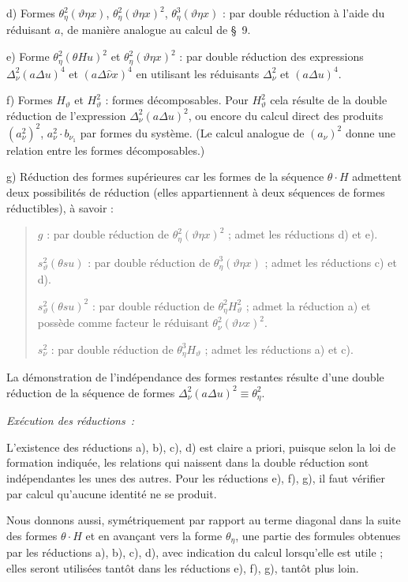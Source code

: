 \documentclass[11pt]{article}
\newcommand{\A}{\Delta}
\begin{document}
d) Formes $\theta_\eta^2(\vartheta\eta x)$, $\theta_\eta^2(\vartheta\eta x)^2$, $\theta_\eta^3(\vartheta\eta x)$ : par double réduction à l'aide du réduisant $a$, de manière analogue au calcul de \S\ 9.

e) Forme $\theta_\eta^2(\theta Hu)^2$ et $\theta_\eta^2(\vartheta\eta x)^2$ : par double réduction des expressions $\A_\nu^2(a\A u)^4$ et $(a\A\widehat{\nu}x)^4$ en utilisant les réduisants $\A_\nu^2$ et $(a\A u)^4$.

f) Formes $H_\vartheta$ et $H_\vartheta^2$ : formes décomposables. Pour $H_\vartheta^2$ cela résulte de la double réduction de l'expression $\A_\nu^2(a\A u)^2$, ou encore du calcul direct des produits $(a_\nu^2)^2$, $a_\nu^2\cdot b_{\nu_1}$ par formes du système. (Le calcul analogue de $(a_\nu)^2$ donne une relation entre les formes décomposables.)

g) Réduction des formes supérieures car les formes de la séquence $\theta\cdot H$ admettent deux possibilités de réduction (elles appartiennent à deux séquences de formes réductibles), à savoir :
\begin{quote}\small
$g$ : par double réduction de $\theta_\eta^2(\vartheta\eta x)^2$ ; admet les réductions d) et e).\par
$s_\vartheta^2(\theta su)$ : par double réduction de $\theta_\eta^3(\vartheta\eta x)$ ; admet les réductions c) et d).\par
$s_\vartheta^2(\theta su)^2$ : par double réduction de $\theta_\eta^2H_\vartheta^2$ ; admet la réduction a) et possède comme facteur le réduisant $\theta_\nu^2(\vartheta\nu x)^2$.\par
$s_\nu^2$ : par double réduction de $\theta_\eta^3H_\vartheta$ ; admet les réductions a) et c).
\end{quote}
La démonstration de l'indépendance des formes restantes résulte d'une double réduction de la séquence de formes $\A_\nu^2(a\A u)^2\equiv\theta_\eta^2$.

\noindent\emph{Exécution des réductions :}

L'existence des réductions a), b), c), d) est claire a priori, puisque selon la loi de formation indiquée, les relations qui naissent dans la double réduction sont indépendantes les unes des autres. Pour les réductions e), f), g), il faut vérifier par calcul qu'aucune identité ne se produit.

Nous donnons aussi, symétriquement par rapport au terme diagonal dans la suite des formes $\theta\cdot H$ et en avançant vers la forme $\theta_\eta$, une partie des formules obtenues par les réductions a), b), c), d), avec indication du calcul lorsqu'elle est utile ; elles seront utilisées tantôt dans les réductions e), f), g), tantôt plus loin.
\end{document}
